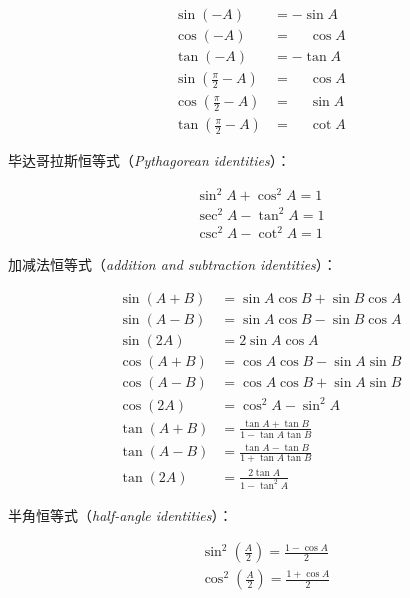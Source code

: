\documentclass[lang=cn,12pt]{elegantbook}
\begin{document}
$$
  \begin{aligned}
    \sin (-A)              & =-\sin A            \\
    \cos (-A)              & =\phantom{-} \cos A \\
    \tan (-A)              & =-\tan A            \\
    \sin (\frac{\pi}{2}-A) & =\phantom{-}\cos A  \\
    \cos (\frac{\pi}{2}-A) & =\phantom{-}\sin A  \\
    \tan (\frac{\pi}{2}-A) & =\phantom{-}\cot A
  \end{aligned}
$$

毕达哥拉斯恒等式（\textit{Pythagorean identities}）：

$$
  \begin{array}{r}
    \sin ^{2} A+\cos ^{2} A=1 \\
    \sec ^{2} A-\tan ^{2} A=1 \\
    \csc ^{2} A-\cot ^{2} A=1
  \end{array}
$$

加减法恒等式（\textit{addition and subtraction identities}）：

$$
  \begin{aligned}
    \sin (A+B) & =\sin A \cos B+\sin B \cos A             \\
    \sin (A-B) & =\sin A \cos B-\sin B \cos A             \\
    \sin (2 A) & =2 \sin A \cos A                         \\
    \cos (A+B) & =\cos A \cos B-\sin A \sin B             \\
    \cos (A-B) & =\cos A \cos B+\sin A \sin B             \\
    \cos (2 A) & =\cos ^{2} A-\sin ^{2} A                 \\
    \tan (A+B) & =\frac{\tan A+\tan {B}}{1-\tan A \tan B} \\
    \tan (A-B) & =\frac{\tan A-\tan B}{1+\tan A \tan B}   \\
    \tan (2 A) & =\frac{2 \tan A}{1-\tan^{2}A}
  \end{aligned}
$$

半角恒等式（\textit{half-angle identities}）：

$$
  \begin{aligned}
     & \sin ^{2}(\frac{A}{2})=\frac{1-\cos A}{2} \\
     & \cos ^{2}(\frac{A}{2})=\frac{1+\cos A}{2}
  \end{aligned}
$$
\end{document}
